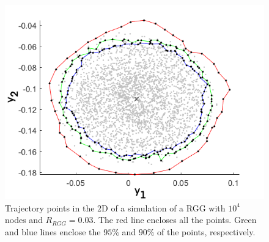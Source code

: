 \begin{figure}
    \centering
    \includegraphics[width=\textwidth]{figures/appendices/area_explainedy.png}
    \caption[Calculating areas in the simplex]{Trajectory points in the $2$D of a simulation of a RGG with $10^4$ nodes and $R_{RGG} = 0.03$. The red line encloses all the points. Green and blue lines enclose the $95\%$ and $90\%$ of the points, respectively.}
    \label{fig:areaExplained}
\end{figure}

